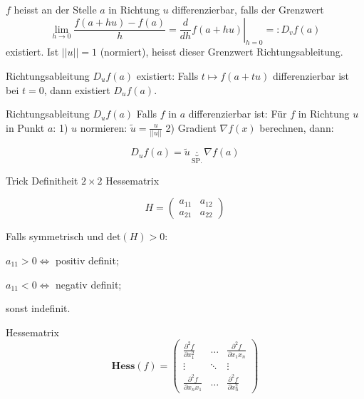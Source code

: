 $f$ heisst an der Stelle $a$ in Richtung $u$ differenzierbar, falls der Grenzwert 
	\[
		\lim_{h\to0}\frac{f(a + hu) -f(a)}{h} =
		\left.\frac{d}{dh}f(a+hu)\right|_{h = 0}
		=: D_vf(a)
	\]
existiert. Ist $||u|| = 1$ (normiert), heisst dieser Grenzwert Richtungsableitung.\\

\begin{Rezept}{Richtungsableitung $D_uf(a)$ existiert:}{} Falls $t \mapsto f(a + tu)$ differenzierbar ist bei $t=0$, dann existiert $D_uf(a)$.
\end{Rezept}

\begin{Rezept}{Richtungsableitung $D_u f(a)$}{}
Falls $f$ in $a$ differenzierbar ist: Für $f$ in Richtung $u$ in Punkt $a$: 1) $u$ normieren: $\tilde{u} = \frac{u}{||u||}$ 2) Gradient $\nabla f(x)$ berechnen, dann:

\[
    D_u f(a) = \tilde{u} \underbrace{\cdot}_{\text{SP.}} \nabla f(a)
\]
\end{Rezept}
	


\begin{Rezept}{Trick Definitheit $2\times 2$ Hessematrix}{}

\[
    H =
        \begin{pmatrix}
            a_{11} & a_{12}\\
            a_{21} & a_{22}
        \end{pmatrix}
\]

Falls symmetrisch und $\text{det}(H) > 0$:

$a_{11} > 0 \iff$ positiv definit;

$a_{11} < 0 \iff$ negativ definit;

sonst indefinit.
\end{Rezept}


\begin{Definition}{Hessematrix}{}
\[
    \mathbf{Hess}(f) =
        \begin{pmatrix}
            \frac{\partial^2 f}{\partial x_1^2}&\hdots&\frac{\partial^2 f}{\partial x_1 x_n}\\
            \vdots&\ddots&\vdots\\
            \frac{\partial^2 f}{\partial x_n x_1}&\hdots&\frac{\partial^2 f}{\partial x_n^2}
        \end{pmatrix}
\]
\end{Definition}

